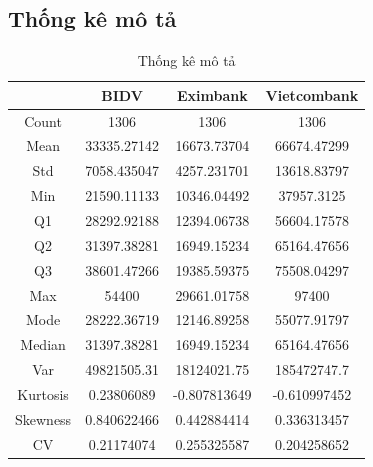 \subsection{Thống kê mô tả}
\begin{table}[H]
    \centering
    \caption{Thống kê mô tả}
    \begin{tabular}{|c|c|c|c|}
         \hline
         \rowcolor{cyan}\centering\  & BIDV & Eximbank & Vietcombank\\\hline
         \multirow{1}{*}{Count} & 1306 & 1306 & 1306 \\\hline
         \multirow{1}{*}{Mean} & 33335.27142 & 16673.73704 & 66674.47299 \\\hline
         \multirow{1}{*}{Std} & 7058.435047 & 4257.231701 & 13618.83797 \\\hline
         \multirow{1}{*}{Min} & 21590.11133 & 10346.04492 & 37957.3125 \\\hline
         \multirow{1}{*}{Q1} & 28292.92188 & 12394.06738 & 56604.17578 \\\hline
         \multirow{1}{*}{Q2} & 31397.38281 & 16949.15234 & 65164.47656 \\\hline
         \multirow{1}{*}{Q3} & 38601.47266 & 19385.59375 & 75508.04297 \\\hline
         \multirow{1}{*}{Max}  & 54400 & 29661.01758  & 97400 \\\hline
         \multirow{1}{*}{Mode} & 28222.36719 & 12146.89258 & 55077.91797 \\\hline
         \multirow{1}{*}{Median} & 31397.38281 & 16949.15234 & 65164.47656 \\\hline
         \multirow{1}{*}{Var} & 49821505.31 & 18124021.75 & 185472747.7 \\\hline
         \multirow{1}{*}{Kurtosis} & 0.23806089 & -0.807813649 & -0.610997452 \\\hline
         \multirow{1}{*}{Skewness} & 0.840622466 & 0.442884414 & 0.336313457 \\\hline
         \multirow{1}{*}{CV} & 0.21174074 & 0.255325587 & 0.204258652 \\\hline
    \end{tabular}
    \label{descriptive-stats}
\end{table}

